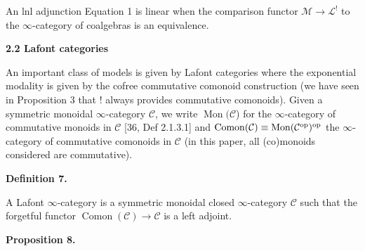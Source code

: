 \documentclass[10pt,a4paper]{article}
\begin{document}
 
An lnl adjunction Equation 1 is linear when the comparison functor ${\mathcal{M}}\to{\mathcal{L}}^{\mathop{!}}$ to the $\infty$-category of coalgebras is an equivalence.\par
 
 
 
 
 
 
\par\medskip\noindent\textbf{2.2 Lafont categories}\par
 
 
An important class of models is given by Lafont categories where the exponential modality is given by the cofree commutative comonoid construction (we have seen in Proposition 3 that $\mathop{!}$ always provides commutative comonoids). Given a symmetric monoidal $\infty$-category ${\mathcal{C}}$, we write $\operatorname{Mon}({\mathcal{C}}$) for the $\infty$-category of commutative monoids in ${\mathcal{C}}$ [36, Def 2.1.3.1] and $\operatorname{Comon}({\mathcal{C}})\equiv\operatorname{Mon}({\mathcal{C}}^{\textnormal{op}})^{\textnormal{op}}$ the $\infty$-category of commutative comonoids in ${\mathcal{C}}$ (in this paper, all (co)monoids considered are commutative).\par
 
 
 
\par\medskip\noindent\textbf{Definition 7.}\par
 
 
A Lafont $\infty$-category is a symmetric monoidal closed $\infty$-category ${\mathcal{C}}$ such that the forgetful functor $\operatorname{Comon}({\mathcal{C}})\to{\mathcal{C}}$ is a left adjoint.\par
 
 
 
 
\par\medskip\noindent\textbf{Proposition 8.}\par
 
\end{document}
